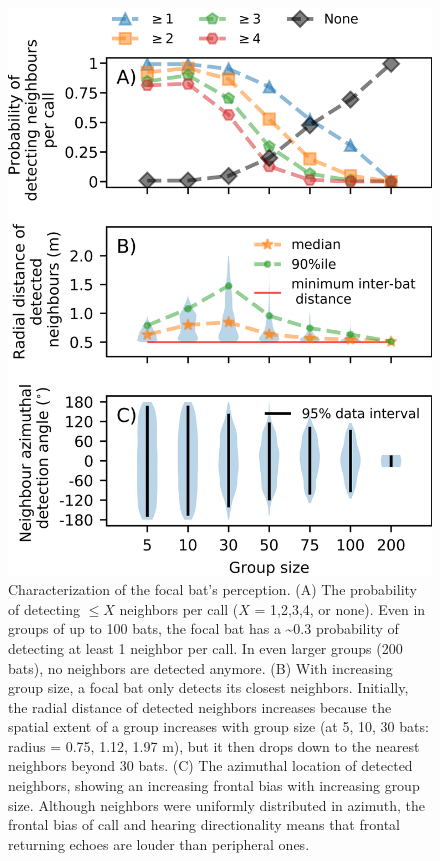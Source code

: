 \documentclass[
]{book}
\begin{document}
\begin{figure}[!htbp]
\includegraphics[]{original_papers/CPN_figures/Figure_3/Figure3_1200dpi_tight.png}
\centering
\caption{Characterization of the focal bat’s perception. (A) The probability of detecting $\leq X$ neighbors per call ($X$ = 1,2,3,4, or none). Even in groups of up to 100 bats, the focal bat has a \textasciitilde0.3 probability of detecting at least 1 neighbor
per call. In even larger groups (200 bats), no neighbors are detected anymore. (B) With increasing group size, a focal bat only detects its closest neighbors. Initially, the radial distance of detected neighbors increases because the spatial extent of a group increases with group size (at 5, 10, 30 bats: radius = 0.75, 1.12, 1.97 m), but it then drops down to the nearest neighbors beyond 30 bats. (C) The azimuthal location of detected neighbors, showing an increasing frontal bias with increasing group size. Although neighbors were uniformly distributed in azimuth, the frontal bias of call and hearing directionality means that frontal returning echoes are louder than peripheral ones.} 
\label{cpn_fig3}
\end{figure}
\end{document}
